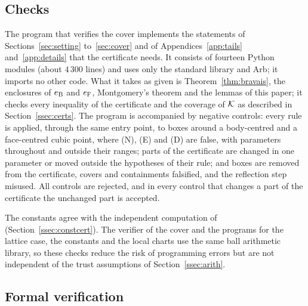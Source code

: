 \subsection{Checks}\label{ssec:checks}

The program that verifies the cover implements the statements of Sections~\ref{sec:setting} to~\ref{sec:cover} and of
Appendices~\ref{app:tails} and~\ref{app:details} that the certificate needs. It consists of fourteen Python modules (about
$4\,300$ lines) and uses only the standard library and Arb; it imports no other code. What it takes
as given is Theorem~\ref{thm:bravais}, the enclosures of $e_{\mathrm B}$ and $e_{\mathrm F}$, Montgomery's theorem and the lemmas of this paper;
it checks every inequality of the certificate and the coverage of $\mathcal K$ as described in Section~\ref{ssec:certs}. The program is accompanied by negative
controls: every rule is applied, through the same entry point, to boxes around a body-centred and a face-centred cubic
point, where (N), (E) and (D) are false, with parameters throughout and outside their ranges; parts of the certificate are
changed in one parameter or moved outside the hypotheses of their rule; and boxes are removed from the certificate, covers
and containments falsified, and the reflection step misused. All controls are rejected, and in every control that changes
a part of the certificate the unchanged part is accepted.

The constants agree with the independent computation of \cite{MuratovNovaga2026} (Section~\ref{ssec:constcert}). The verifier
of the cover and the programs for the lattice case, the constants and the local charts use the same ball arithmetic library,
so these checks reduce the risk of programming errors but are not independent of the trust assumptions of
Section~\ref{ssec:arith}.

\subsection{Formal verification}\label{ssec:lean}

